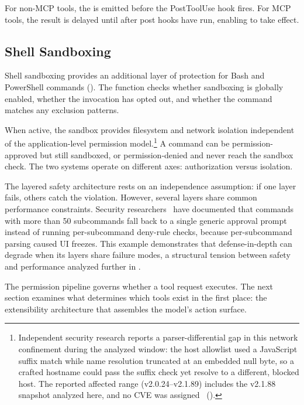 For non-MCP tools, the  is emitted before the PostToolUse hook fires. For MCP tools, the result is delayed until after post hooks have run, enabling  to take effect.

\subsection{Shell Sandboxing}
\label{sec:auth:sandbox}

Shell sandboxing provides an additional layer of protection for Bash and PowerShell commands (). The  function checks whether sandboxing is globally enabled, whether the invocation has opted out, and whether the command matches any exclusion patterns.

When active, the sandbox provides filesystem and network isolation independent of the application-level permission model.\footnote{Independent security research reports a parser-differential gap in this network confinement during the analyzed window: the host allowlist used a JavaScript suffix match while name resolution truncated at an embedded null byte, so a crafted hostname could pass the suffix check yet resolve to a different, blocked host. The reported affected range (v2.0.24--v2.1.89) includes the v2.1.88 snapshot analyzed here, and no CVE was assigned~\citep{cybersecnews2026sandbox} (\tierC{}).} A command can be permission-approved but still sandboxed, or permission-denied and never reach the sandbox check. The two systems operate on different axes: authorization versus isolation.

The layered safety architecture rests on an independence assumption: if one layer fails, others catch the violation. However, several layers share common performance constraints. Security researchers~\citep{adversa2026bypass} have documented that commands with more than 50 subcommands fall back to a single generic approval prompt instead of running per-subcommand deny-rule checks, because per-subcommand parsing caused UI freezes. This example demonstrates that defense-in-depth can degrade when its layers share failure modes, a structural tension between safety and performance analyzed further in .

The permission pipeline governs whether a tool request executes. The next section examines what determines which tools exist in the first place: the extensibility architecture that assembles the model's action surface.
